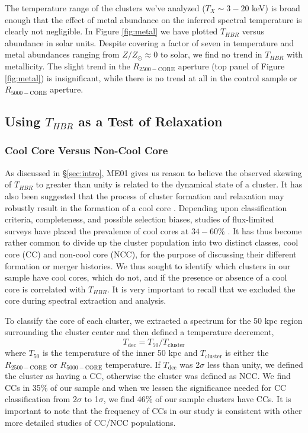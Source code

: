 \documentclass[apj]{emulateapj}
\begin{document}
The temperature range of the clusters we've analyzed ($T_X \sim 3-20$
keV) is broad enough that the effect of metal abundance on the
inferred spectral temperature is clearly not negligible. In Figure
\ref{fig:metal} we have plotted $T_{HBR}$ versus abundance in solar
units. Despite covering a factor of seven in temperature and
metal abundances ranging from $Z/Z_{\odot} \approx 0$ to solar, we
find no trend in $T_{HBR}$ with metallicity. The slight trend in the
$R_{2500-\mathrm{CORE}}$ aperture (top panel of Figure
\ref{fig:metal}) is insignificant, while there is no trend at all in
the control sample or $R_{5000-\mathrm{CORE}}$ aperture.

\subsection{Using $T_{HBR}$ as a Test of Relaxation} \label{sec:relax}

\subsubsection{Cool Core Versus Non-Cool Core}\label{sec:ccncc}

As discussed in \S\ref{sec:intro}, ME01 gives us reason to believe the
observed skewing of $T_{HBR}$ to greater than unity is related to the
dynamical state of a cluster. It has also been suggested that the
process of cluster formation and relaxation may robustly result in
the formation of a cool core
\citep{2006ApJ...640..673O,2007arXiv0708.1954B}. Depending upon
classification criteria, completeness, and possible selection biases,
studies of flux-limited surveys have placed the prevalence of cool
cores at $34-60\%$ \citep{1997MNRAS.292..419W, 1998MNRAS.298..416P,
2005MNRAS.359.1481B, 2007A&A...466..805C}. It has thus become rather
common to divide up the cluster population into two distinct classes,
cool core (CC) and non-cool core (NCC), for the purpose of discussing
their different formation or merger histories. We thus sought to
identify which clusters in our sample have cool cores, which do not,
and if the presence or absence of a cool core is correlated with
$T_{HBR}$. It is very important to recall that we excluded the core
during spectral extraction and analysis.

To classify the core of each cluster, we extracted a spectrum for the
50 kpc region surrounding the cluster center and then defined a
temperature decrement,
\begin{equation}
T_{\mathrm{dec}} = T_{50}/T_{\mathrm{cluster}}
\label{eqn:tdec}
\end{equation}
where $T_{50}$ is the temperature of the inner 50 kpc and
$T_{\mathrm{cluster}}$ is either the $R_{2500-\mathrm{CORE}}$ or
$R_{5000-\mathrm{CORE}}$ temperature. If $T_{\mathrm{dec}}$ was
2$\sigma$ less than unity, we defined the cluster as having a CC,
otherwise the cluster was defined as NCC. We find CCs in 35\% of our
sample and when we lessen the significance needed for CC
classification from 2$\sigma$ to 1$\sigma$, we find 46\% of our sample
clusters have CCs. It is important to note that the frequency of CCs
in our study is consistent with other more detailed studies of CC/NCC
populations.
\end{document}
